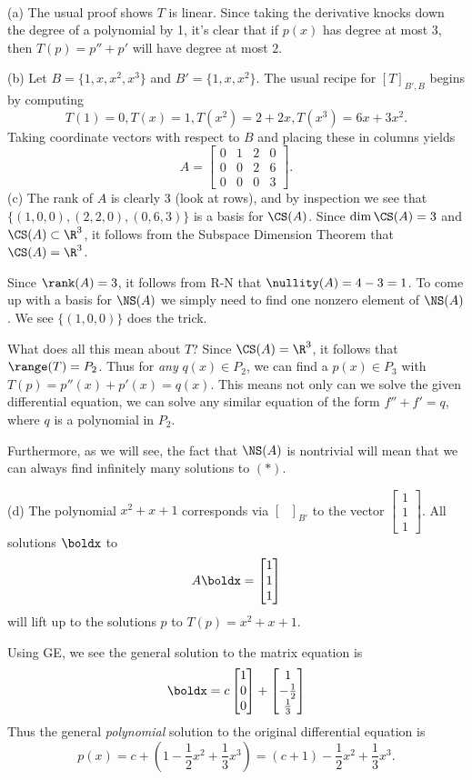 \begin{solution}
\ \\(a) The usual proof shows $T$ is linear. Since taking the derivative knocks down the degree of a polynomial by 1, it's clear that if $p(x)$ has degree at most $3$, then $T(p)=p''+p'$ will have degree at most $2$.

(b) Let $B=\{1,x,x^2,x^3\}$ and $B'=\{1, x, x^2\}$. The usual recipe for $[T]_{B',B}$ begins by computing 
\[
T(1)=0, T(x)=1, T(x^2)=2+2x, T(x^3)=6x+3x^2.
\] 
Taking coordinate vectors with respect to $B$ and placing these in columns yields 
\[
A=\begin{bmatrix}
0&1&2&0\\
0&0&2&6\\
0&0&0&3
\end{bmatrix}.
\]
(c) The rank of $A$ is clearly 3 (look at rows), and by inspection we see that $\{(1,0,0), (2,2,0), (0,6,3)\}$ is a basis for $\CS(A)$. Since $\dim\CS(A)=3$ and $\CS(A)\subset\R^3$, it follows from the Subspace Dimension Theorem that $\CS(A)=\R^3$.

Since $\rank(A)=3$, it follows from R-N that $\nullity(A)=4-3=1$. To come up with a basis for $\NS(A)$ we simply need to find one nonzero element of $\NS(A)$. We see $\{(1,0,0)\}$ does the trick. 

What does all this mean about $T$? Since $\CS(A)=\R^3$, it follows that $\range(T)=P_2$. Thus for {\em any} $q(x)\in P_2$, we can find a $p(x)\in P_3$ with $T(p)=p''(x)+p'(x)=q(x)$. This means not only can we solve the given differential equation, we can solve any similar equation of the form $f''+f'=q$, where $q$ is a polynomial in $P_2$.  

Furthermore, as we will see, the fact that $\NS(A)$ is nontrivial will mean that we can always find infinitely many solutions to $(*)$. 

(d) The polynomial $x^2+x+1$ corresponds via $[\hspace{8pt}]_{B'}$ to the vector $\begin{bmatrix}1\\ 1\\ 1\end{bmatrix}$. All solutions $\boldx$ to
\[
A\boldx=\begin{bmatrix}1\\ 1\\ 1\end{bmatrix}
\] 
will lift up to the solutions $p$ to $T(p)=x^2+x+1$. 

Using GE, we see the general solution to the matrix equation is 
\[
\boldx=c\begin{bmatrix}1 \\ 0 \\ 0 \end{bmatrix}+\begin{bmatrix}1\\-\frac{1}{2}\\ \frac{1}{3} \end{bmatrix}
\]
Thus the general {\em polynomial} solution to the original differential equation is 
\[
p(x)=c+(1-\frac{1}{2}x^2+\frac{1}{3}x^3)=(c+1)-\frac{1}{2}x^2+\frac{1}{3}x^3.
\]

\end{solution}
